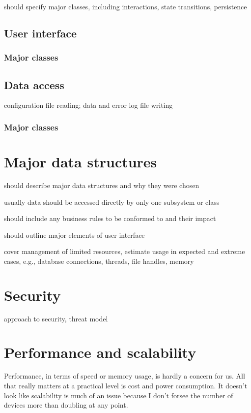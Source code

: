 \documentclass[pdftex,oneside,12pt,a4paper]{book}
\begin{document}
should specify major classes, including interactions, state transitions, persistence

\subsection{User interface}
\subsubsection{Major classes}

\subsection{Data access}
configuration file reading; data and error log file writing

\subsubsection{Major classes}

\section{Major data structures}
should describe major data structures and why they were chosen

usually data should be accessed directly by only one subsystem or class

should include any business rules to be conformed to and their impact

should outline major elements of user interface

cover management of limited resources, estimate usage in expected and extreme cases, e.g., database connections, threads, file handles, memory

\section{Security}
approach to security, threat model

\section{Performance and scalability}
Performance, in terms of speed or memory usage, is hardly a concern for us.  All that really matters at a practical level is cost and power consumption.  It doesn't look like scalability is much of an issue because I don't forsee the number of devices more than doubling at any point.
\end{document}
